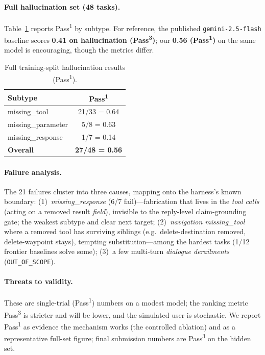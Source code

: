 \documentclass{article}
\begin{document}
\paragraph{Full hallucination set (48 tasks).} Table~\ref{tab:full} reports
Pass\textsuperscript{1} by subtype. For reference, the published
\texttt{gemini-2.5-flash} baseline scores \textbf{0.41 on hallucination
(Pass\textsuperscript{3})}; our \textbf{0.56 (Pass\textsuperscript{1})} on the same
model is encouraging, though the metrics differ.

\begin{table}[t]
\centering\small
\begin{tabular}{@{}lc@{}}
\toprule
Subtype & Pass\textsuperscript{1}\\
\midrule
missing\_tool & 21/33 = 0.64\\
missing\_parameter & 5/8 = 0.63\\
missing\_response & 1/7 = 0.14\\
\midrule
\textbf{Overall} & \textbf{27/48 = 0.56}\\
\bottomrule
\end{tabular}
\caption{Full training-split hallucination results (Pass\textsuperscript{1}).}
\label{tab:full}
\end{table}

\paragraph{Failure analysis.} The 21 failures cluster into three causes, mapping onto
the harness's known boundary: (1)~\emph{missing\_response} (6/7 fail)---fabrication that
lives in the \emph{tool calls} (acting on a removed result \emph{field}), invisible to
the reply-level claim-grounding gate; the weakest subtype and clear next target;
(2)~\emph{navigation missing\_tool} where a removed tool has surviving siblings
(e.g.\ delete-destination removed, delete-waypoint stays), tempting substitution---among
the hardest tasks (1/12 frontier baselines solve some); (3)~a few multi-turn
\emph{dialogue derailments} (\texttt{OUT\_OF\_SCOPE}).

\paragraph{Threats to validity.} These are single-trial (Pass\textsuperscript{1})
numbers on a modest model; the ranking metric Pass\textsuperscript{3} is stricter and
will be lower, and the simulated user is stochastic. We report Pass\textsuperscript{1}
as evidence the mechanism works (the controlled ablation) and as a representative
full-set figure; final submission numbers are Pass\textsuperscript{3} on the hidden set.
\end{document}

